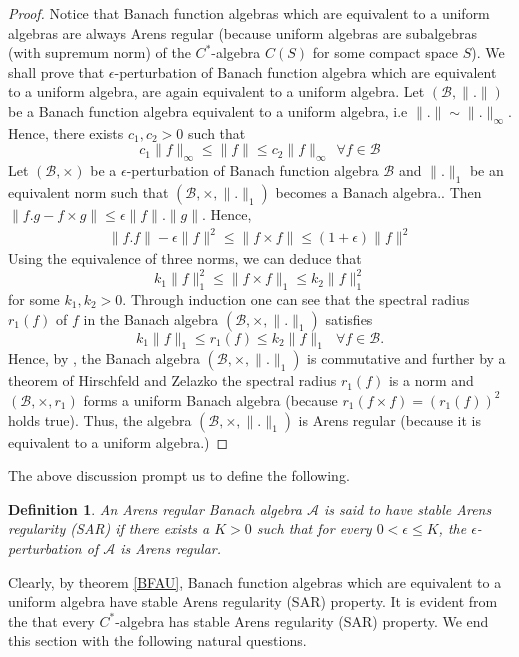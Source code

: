 \documentclass[pdflatex,sn-mathphys-num]{sn-jnl}%
\newtheorem{definition}{Definition}
\theoremstyle{thmstyleone}%
\theoremstyle{thmstyletwo}%
\theoremstyle{thmstylethree}%
\begin{document}
\begin{proof}
	Notice that Banach function algebras which are equivalent to a uniform algebras are always Arens regular (because uniform algebras are subalgebras (with supremum norm) of the $C^*$-algebra $C(S)$ for some compact space $S$). We shall prove that $\epsilon$-perturbation of Banach function algebra which are equivalent to a uniform algebra, are again equivalent to a uniform algebra.
	Let $(\mathcal B, \|.\|)$ be a Banach function algebra equivalent to a uniform algebra, i.e $\|.\|\sim \|.\|_\infty$. Hence, there exists $c_1,c_2>0$ such that \begin{equation}
		c_1\|f\|_\infty\leq \|f\|\leq c_2\|f\|_\infty~~\forall f\in \mathcal B
	\end{equation}
	Let $(\mathcal B, \times)$ be a $\epsilon$-perturbation of Banach function algebra $\mathcal B$ and $\|.\|_1$ be an equivalent norm such that $(\mathcal B, \times, \|.\|_1)$ becomes a Banach algebra.. Then $\|f.g-f\times g\|\leq \epsilon\|f\|.\|g\|$. Hence,
	\begin{align*}
		\|f.f\|-\epsilon\|f\|^2\leq\|f\times f\|\leq (1+\epsilon)\|f\|^2
	\end{align*}
	Using the equivalence of three norms, we can deduce that 
	\begin{equation}
		k_1\|f\|_1^2\leq \|f\times f\|_1\leq k_2\|f\|_1^2
	\end{equation}
for some $k_1,k_2>0$.	Through induction one can see that the spectral radius $r_1(f)$ of $f$ in the Banach algebra $(\mathcal B, \times ,\|.\|_1)$ satisfies $$k_1\|f\|_1\leq r_1(f)\leq k_2\|f\|_1~~~\forall f\in \mathcal B.$$
Hence, by \cite[Corollary 5 ]{Gerd}, the Banach algebra $(\mathcal B, \times, \|.\|_1)$ is commutative and further by a theorem of Hirschfeld and Zelazko \cite[Corollary 8]{Gerd} the spectral radius $r_1(f)$ is a norm and $(\mathcal B, \times, r_1)$ forms a uniform Banach algebra (because $r_1(f\times f)=(r_1(f))^2$ holds true). Thus, the algebra $(\mathcal B, \times , \|.\|_1)$ is Arens regular (because it is equivalent to a uniform algebra.)
\end{proof}
The above discussion prompt us to define the following.
\begin{definition}
	An Arens regular Banach algebra $\mathcal A$ is said to have stable Arens regularity (SAR) if there exists a $K>0$ such that for every $0<\epsilon\leq K$, the $\epsilon$-perturbation of $\mathcal A$ is Arens regular.
\end{definition}
Clearly, by theorem \ref{BFAU}, Banach function algebras which are equivalent to a uniform algebra have stable Arens regularity (SAR) property. It is evident from the \cite[Th. 1]{Palacios} that every $C^*$-algebra has stable Arens regularity (SAR) property. We end this section with the following natural questions.\\
\end{document}
